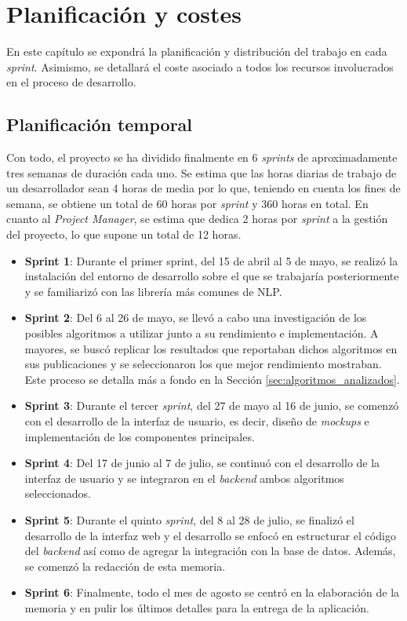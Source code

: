 \chapter{Planificación y costes}
\label{chap:planificacion}

En este capítulo se expondrá la planificación y distribución del trabajo en cada \textit{sprint}. Asimismo,
se detallará el coste asociado a todos los recursos involucrados en el proceso de desarrollo.

\section{Planificación temporal}
\label{sec:planificacion_temporal}

Con todo, el proyecto se ha dividido finalmente en 6 \textit{sprints} de aproximadamente tres semanas de duración cada uno.
Se estima que las horas diarias de trabajo de un desarrollador sean 4 horas de media por lo que, teniendo en cuenta los fines de semana, se obtiene
un total de 60 horas por \textit{sprint} y 360 horas en total. En cuanto al \textit{Project Manager}, se estima que dedica 2 horas por \textit{sprint}
a la gestión del proyecto, lo que supone un total de 12 horas.

\begin{itemize}
	\item \textbf{Sprint 1}: Durante el primer sprint, del 15 de abril al 5 de mayo, se realizó la instalación del entorno
	de desarrollo sobre el que se trabajaría posteriormente y se familiarizó con las librería más comunes de NLP.
	\item \textbf{Sprint 2}: Del 6 al 26 de mayo, se llevó a cabo una investigación de los posibles algoritmos a utilizar
	junto a su rendimiento e implementación. A mayores, se buscó replicar los resultados que reportaban dichos algoritmos
	en sus publicaciones y se seleccionaron los que mejor rendimiento mostraban. Este proceso se detalla más a fondo en la Sección \ref{sec:algoritmos_analizados}.
	\item \textbf{Sprint 3}: Durante el tercer \textit{sprint}, del 27 de mayo al 16 de junio, se comenzó con el desarrollo
	de la interfaz de usuario, es decir, diseño de \textit{mockups} e implementación de los componentes principales.
	\item \textbf{Sprint 4}: Del 17 de junio al 7 de julio, se continuó con el desarrollo de la interfaz de usuario y se integraron
	en el \textit{backend} ambos algoritmos seleccionados.
	\item \textbf{Sprint 5}: Durante el quinto \textit{sprint}, del 8 al 28 de julio, se finalizó el desarrollo de la interfaz web
	y el desarrollo se enfocó en estructurar el código del \textit{backend} así como de agregar la integración con la base de datos. 
	Además, se comenzó la redacción de esta memoria.
	\item \textbf{Sprint 6}: Finalmente, todo el mes de agosto se centró en la elaboración de la memoria y en pulir los últimos detalles
	para la entrega de la aplicación.
\end{itemize}

